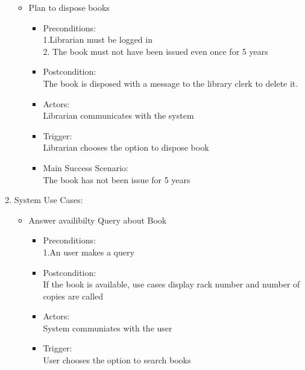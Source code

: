 \documentclass{article}
\begin{document}
\begin{enumerate}
\begin{itemize}
\item Plan to dispose books\\ 
 \begin{itemize}
  \item Preconditions:\\ 1.Librarian must be logged in\\ 2. The book must not have been issued even once for 5 years\\ 
 \item Postcondition:\\ The book is disposed with a message to the library clerk to delete it.\\ 
 \item Actors:\\  Librarian communicates with the system\\ 
 \item Trigger:\\  Librarian  chooses the option to dispose book\\ 
 \item Main Success Scenario:\\  The book has not been issue for 5 years\\ 
 \end{itemize}
 

\end{itemize}

\item System Use Cases:\\ 
 \begin{itemize}
 
  \item Answer availibilty Query about Book\\ 
	\begin{itemize}
	\item  Preconditions:\\ 1.An user makes a query\\ 
 \item Postcondition: \\ If the book is available, use cases display rack number and number of copies are called\\ 
 \item Actors:\\  System communiates with the user\\ 
 \item Trigger: \\ User chooses the option to search books\\ 
	\end{itemize}


\end{itemize}
\end{enumerate}
\end{document}
